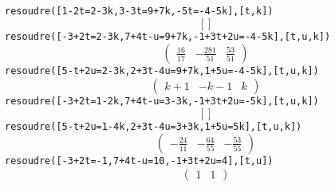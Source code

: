 \begin{TP}
\noindent {} {\tt resoudre([1-2t=2-3k,3-3t=9+7k,-5t=-4-5k],[t,k]) } \\
\begin{equation} \label{eq:0}
[]
\end{equation}
\noindent {} {\tt resoudre([-3+2t=2-3k,7+4t-u=9+7k,-1+3t+2u=-4-5k],[t,u,k]) } \\
\begin{equation} \label{eq:1}
\left(\begin{array}{ccc}
\frac{16}{17} & -\frac{281}{51} & \frac{53}{51}
\end{array}\right) 
\end{equation}
\noindent {} {\tt resoudre([5-t+2u=2-3k,2+3t-4u=9+7k,1+5u=-4-5k],[t,u,k]) } \\
\begin{equation} \label{eq:2}
\left(\begin{array}{ccc}
k+1 & -k-1 & k
\end{array}\right) 
\end{equation}
\noindent {} {\tt resoudre([-3+2t=1-2k,7+4t-u=3-3k,-1+3t+2u=-5k],[t,u,k]) } \\
\begin{equation} \label{eq:3}
[]
\end{equation}
\noindent {} {\tt resoudre([5-t+2u=1-4k,2+3t-4u=3+3k,1+5u=5k],[t,u,k]) } \\
\begin{equation} \label{eq:4}
\left(\begin{array}{ccc}
-\frac{24}{11} & -\frac{64}{55} & -\frac{53}{55}
\end{array}\right) 
\end{equation}
\noindent {} {\tt resoudre([-3+2t=-1,7+4t-u=10,-1+3t+2u=4],[t,u]) } \\
\begin{equation} \label{eq:5}
\left(\begin{array}{cc}
1 & 1
\end{array}\right) 
\end{equation}


\end{TP}
